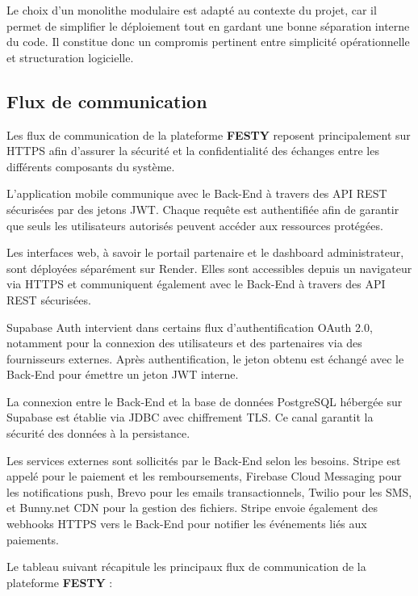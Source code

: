 Le choix d'un monolithe modulaire est adapté au contexte du projet, car il permet de simplifier le déploiement tout en gardant une bonne séparation interne du code. Il constitue donc un compromis pertinent entre simplicité opérationnelle et structuration logicielle.

\subsection{Flux de communication}
Les flux de communication de la plateforme \textbf{FESTY} reposent principalement sur HTTPS afin d’assurer la sécurité et la confidentialité des échanges entre les différents composants du système.

L’application mobile communique avec le Back-End à travers des API REST sécurisées par des jetons JWT. Chaque requête est authentifiée afin de garantir que seuls les utilisateurs autorisés peuvent accéder aux ressources protégées.

Les interfaces web, à savoir le portail partenaire et le dashboard administrateur, sont déployées séparément sur Render. Elles sont accessibles depuis un navigateur via HTTPS et communiquent également avec le Back-End à travers des API REST sécurisées.

Supabase Auth intervient dans certains flux d’authentification OAuth 2.0, notamment pour la connexion des utilisateurs et des partenaires via des fournisseurs externes. Après authentification, le jeton obtenu est échangé avec le Back-End pour émettre un jeton JWT interne.

La connexion entre le Back-End et la base de données PostgreSQL hébergée sur Supabase est établie via JDBC avec chiffrement TLS. Ce canal garantit la sécurité des données à la persistance.

Les services externes sont sollicités par le Back-End selon les besoins. Stripe est appelé pour le paiement et les remboursements, Firebase Cloud Messaging pour les notifications push, Brevo pour les emails transactionnels, Twilio pour les SMS, et Bunny.net CDN pour la gestion des fichiers. Stripe envoie également des webhooks HTTPS vers le Back-End pour notifier les événements liés aux paiements.

Le tableau suivant récapitule les principaux flux de communication de la plateforme \textbf{FESTY} :

